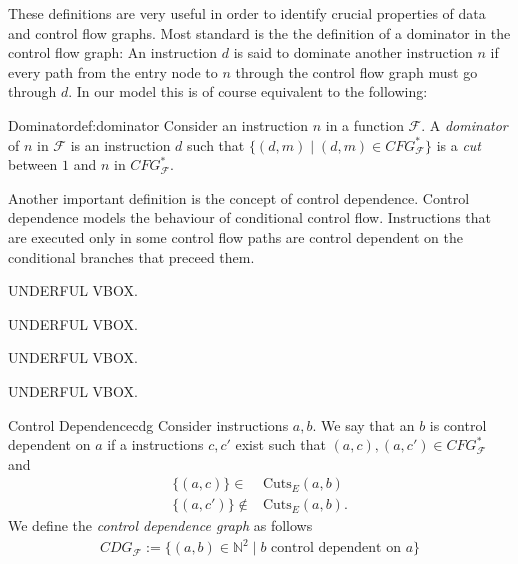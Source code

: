     These definitions are very useful in order to identify crucial properties of
    data and control flow graphs.
    Most standard is the the definition of a dominator in the control flow
    graph: An instruction $d$ is said to dominate another instruction $n$ if
    every path from the entry node to $n$ through the control flow graph must
    go through $d$.
    In our model this is of course equivalent to the following:

    \begin{definition}{Dominator}{def:dominator}
        Consider an instruction $n$ in a function $\mathcal F$.
        A {\em dominator} of $n$ in $\mathcal{F}$ is an instruction $d$ such
        that $\{(d,m)\mid(d,m)\in CFG_\mathcal{F}^*\}$ is a {\em cut} between $1$ and $n$ in $CFG_\mathcal{F}^*$.
    \end{definition}

    Another important definition is the concept of control dependence.
    Control dependence models the behaviour of conditional control flow.
    Instructions that are executed only in some control flow paths are control
    dependent on the conditional branches that preceed them.

    UNDERFUL VBOX.

    UNDERFUL VBOX.

    UNDERFUL VBOX.

    UNDERFUL VBOX.

    \begin{definition}{Control Dependence}{cdg}
        Consider instructions $a,b$.
        We say that an $b$ is control dependent on $a$ if a instructions
        $c,c'$ exist such that $(a,c),(a,c')\in CFG_\mathcal{F}^*$ and
        \begin{align*}
            \{(a,c)\}\in{}&{}\text{Cuts}_E(a,b)\\
            \{(a,c')\}\notin{}&{}\text{Cuts}_E(a,b)\text{.}
        \end{align*}
        We define the {\em control dependence graph} as follows
        \begin{align*}
            CDG_\mathcal{F}:=\{(a,b)\in\mathbb{N}^2\mid b\text{ control dependent on }a\}
        \end{align*}
    \end{definition}

